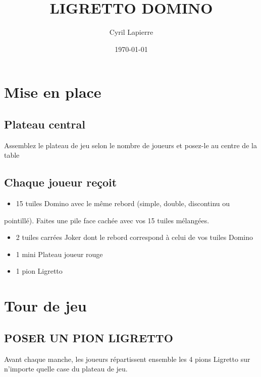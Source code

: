 \documentclass{article}%
\title{LIGRETTO DOMINO}%
\author{Cyril Lapierre}%
\date{\today}%
\begin{document}
%
\pagestyle{empty}%
\normalsize%
\maketitle%
\section{ Mise en place
}%
\label{sec:Miseenplace}%

%
\subsection{ Plateau central
}%
\label{subsec:Plateaucentral}%
Assemblez le plateau de jeu selon le nombre de joueurs et posez{-}le au centre de la table


%
\subsection{ Chaque joueur reçoit
}%
\label{subsec:Chaquejoueurreoit}%
\begin{itemize}%
\item%
%
 15 tuiles Domino avec le même rebord (simple, double, discontinu ou
%
\end{itemize}%
pointillé). Faites une pile face cachée avec vos 15 tuiles mélangées.
%
\begin{itemize}%
\item%
%
 2 tuiles carrées Joker dont le rebord correspond à celui de vos tuiles Domino
%
\item%
%
 1 mini Plateau joueur rouge
%
\item%
%
 1 pion Ligretto
%
\end{itemize}

%
\section{ Tour de jeu
}%
\label{sec:Tourdejeu}%

%
\subsection{ POSER UN PION LIGRETTO
}%
\label{subsec:POSERUNPIONLIGRETTO}%
Avant chaque manche, les joueurs répartissent ensemble les 4 pions Ligretto sur n’importe quelle case du plateau de jeu.


%
\end{document}
